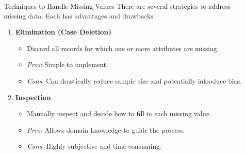 \begin{frame}{Techniques to Handle Missing Values}
There are several strategies to address missing data. Each has advantages and drawbacks:

\begin{enumerate}
  \item \textbf{Elimination (Case Deletion)}
  \begin{itemize}
    \item Discard all records for which one or more attributes are missing.
    \item \textit{Pros}: Simple to implement.
    \item \textit{Cons}: Can drastically reduce sample size and potentially introduce bias.
  \end{itemize}

  \vspace{0.2cm}

  \item \textbf{Inspection}
  \begin{itemize}
    \item Manually inspect and decide how to fill in each missing value.
    \item \textit{Pros}: Allows domain knowledge to guide the process.
    \item \textit{Cons}: Highly subjective and time-consuming.
  \end{itemize}
\end{enumerate}
\end{frame}

